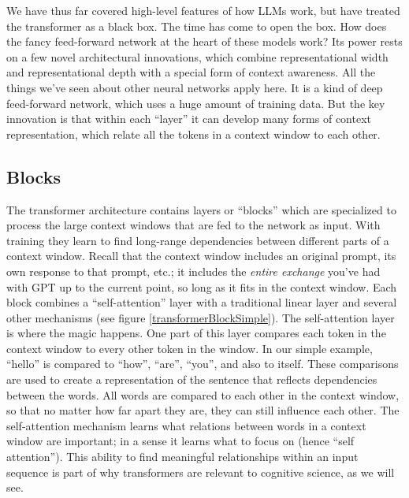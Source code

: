 We have thus far covered high-level features of how LLMs work, but have treated the transformer as a black box. The time has come to open the box. How does the fancy feed-forward network at the heart of these models work? Its power rests on a few novel architectural innovations, which combine representational width and representational depth with a special form of context awareness. All the things we've seen about other neural networks apply here. It is a kind of deep feed-forward network, which uses a huge amount of training data. But the key innovation is that within each ``layer'' it can develop many forms of context representation, which relate all the tokens in a context window to each other.

\subsection{Blocks}


The transformer architecture \cite{vaswani2017attention} contains layers or ``blocks'' which are specialized to process the large context windows that are fed to the network as input. With training they learn to find long-range dependencies between different parts of a context window. Recall that the context window  includes an original prompt, its own response to that prompt, etc.; it includes the \emph{entire exchange} you've had with GPT up to the current point, so long as it fits in the context window. Each block combines a ``self-attention'' layer with a traditional linear layer and several other mechanisms (see figure \ref{transformerBlockSimple}). The self-attention layer is where the magic happens. One part of this layer compares each token in the context window to every other token in the window. In our simple example, ``hello'' is compared to ``how'', ``are'',  ``you'', and also to itself. These comparisons are used to create a representation of the sentence that reflects dependencies between the words. All words are compared to each other in the context window, so that no matter how far apart they are, they can still influence each other. The self-attention mechanism learns what relations between words in a context window are important; in a sense it learns what to focus on (hence ``self attention''). This ability to find meaningful relationships within an input sequence is part of why transformers are relevant to cognitive science, as we will see.

